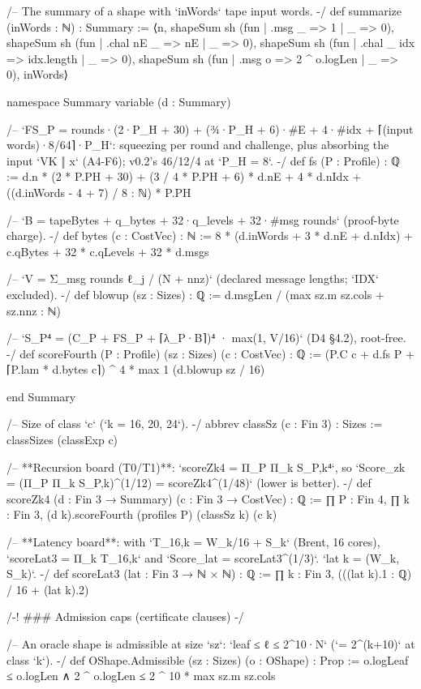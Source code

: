 \begin{leancode}[fontsize=\scriptsize,label={\footnotesize Contract/Cost.lean}]
/-- The summary of a shape with `inWords` tape input words. -/
def summarize (inWords : ℕ) : Summary :=
  ⟨n, shapeSum sh (fun | .msg _ => 1 | _ => 0), shapeSum sh (fun | .chal nE _ => nE | _ => 0),
    shapeSum sh (fun | .chal _ idx => idx.length | _ => 0), shapeSum sh (fun | .msg o => 2 ^ o.logLen | _ => 0),
    inWords⟩

namespace Summary
variable (d : Summary)

/-- `FS_P = rounds·(2·P_H + 30) + (¾·P_H + 6)·#E + 4·#idx + ⌈(input words)·8/64⌉·P_H`: squeezing
per round and challenge, plus absorbing the input `VK ‖ x` (A4-F6); v0.2's 46/12/4 at `P_H = 8`. -/
def fs (P : Profile) : ℚ :=
  d.n * (2 * P.PH + 30) + (3 / 4 * P.PH + 6) * d.nE + 4 * d.nIdx + ((d.inWords - 4 + 7) / 8 : ℕ) * P.PH

/-- `B = tapeBytes + q_bytes + 32·q_levels + 32·#msg rounds` (proof-byte charge). -/
def bytes (c : CostVec) : ℕ := 8 * (d.inWords + 3 * d.nE + d.nIdx) + c.qBytes + 32 * c.qLevels + 32 * d.msgs

/-- `V = Σ_{msg rounds} ℓ_j / (N + nnz)` (declared message lengths; `IDX` excluded). -/
def blowup (sz : Sizes) : ℚ := d.msgLen / (max sz.m sz.cols + sz.nnz : ℕ)

/-- `S_P⁴ = (C_P + FS_P + ⌈λ_P·B⌉)⁴ · max(1, V/16)` (D4 §4.2), root-free. -/
def scoreFourth (P : Profile) (sz : Sizes) (c : CostVec) : ℚ :=
  (P.C c + d.fs P + ⌈P.lam * d.bytes c⌉) ^ 4 * max 1 (d.blowup sz / 16)

end Summary

/-- Size of class `c` (`k = 16, 20, 24`). -/
abbrev classSz (c : Fin 3) : Sizes := classSizes (classExp c)

/-- **Recursion board (T0/T1)**: `scoreZk4 = Π_P Π_k S_P,k⁴`, so
`Score_zk = (Π_P Π_k S_P,k)^(1/12) = scoreZk4^(1/48)` (lower is better). -/
def scoreZk4 (d : Fin 3 → Summary) (c : Fin 3 → CostVec) : ℚ :=
  ∏ P : Fin 4, ∏ k : Fin 3, (d k).scoreFourth (profiles P) (classSz k) (c k)

/-- **Latency board**: with `T_16,k = W_k/16 + S_k` (Brent, 16 cores),
`scoreLat3 = Π_k T_16,k` and `Score_lat = scoreLat3^(1/3)`. `lat k = (W_k, S_k)`. -/
def scoreLat3 (lat : Fin 3 → ℕ × ℕ) : ℚ := ∏ k : Fin 3, (((lat k).1 : ℚ) / 16 + (lat k).2)

/-! ### Admission caps (certificate clauses) -/

/-- An oracle shape is admissible at size `sz`: `leaf ≤ ℓ ≤ 2^10·N` (`= 2^(k+10)` at class `k`). -/
def OShape.Admissible (sz : Sizes) (o : OShape) : Prop :=
  o.logLeaf ≤ o.logLen ∧ 2 ^ o.logLen ≤ 2 ^ 10 * max sz.m sz.cols


\end{leancode}
